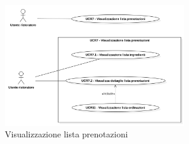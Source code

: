 \label{usecase:Visualizzazione lista prenotazioni}

\begin{figure}[h]
	\centering
	\includegraphics[width=0.7\textwidth]{./uml/UCR-7.png} 
	\caption{Visualizzazione lista prenotazioni}
	\label{fig:UCR7}
  \end{figure}

